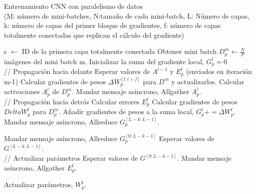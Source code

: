 \begin{algorithm}
	\caption{Entrenamiento CNN con paralelismo de datos \cite{CNN_parallel_International_Conference}\\
	(M: número de mini-batches, N:tamaño de cada mini-batch, L: Número de capas, k: número de capas del primer bloque de gradientes, f: número de capas totalmente conectadas que replican el cálculo del gradiente)} 
	\begin{algorithmic}
		\State s $\gets$ ID de la primera capa totalmente conectada
				\State Obtener mini batch $D^m_p \gets \frac{N}{P}$ imágenes del mini batch m.
				\State Inicializar la suma del gradiente local, $G^l_p = 0$\\
				
				\State // Propagación hacia delante
						\State Esperar valores de $A^{l-1}$ y $E^l_p$ (enviados en iteración m-1)
						\State Calcular gradientes de pesos $\Delta W^{[l:l+f]}_p$ para $D^m$ 
						\State y actualizarlos.
					\EndIf
					\State Calcular activaciones $A^l_p$ de $D^m_p$.
						\State Mandar mensaje asíncrono, Allgather $A^l_p$.
					\EndIf
				\EndFor \\
				
				\State // Propagación hacia detrás
					\State Calcular errores $E^l_p$
						\State Calcular gradientes de pesos $Delta W^l_p$ para $D^m_p$.
						\State Añadir gradientes de pesos a la suma local, $G^l_p += \Delta W^l_p$.
							\State Mandar mensaje asíncrono, Allreduce $G^{[L-k:L-1]}_p$.
						\EndIf
					\EndIf
				\EndFor
				
				\State Mandar mensaje asíncrono, Allreduce $G^{[0:L-k-1]}_p$
				\State Esperar valores de $G^{[L-k:L-1]}$.\\
				
				\State // Actualizar parámetros
						\State Esperar valores de $G^{[0:L-k-1]}$.
							\State Mandar mensaje asíncrono, Allgather $E^l_p$.
						\EndFor
					\EndIf
					
						\State Actualizar parámetros, $W^l_p$.
					\EndIf
				\EndFor
			
			\EndFor
		\EndFor
	\end{algorithmic}
\end{algorithm}

